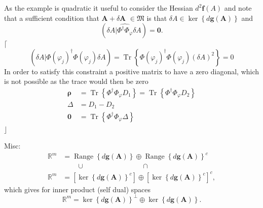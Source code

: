 \documentclass[aps,preprint]{revtex4}%
\begin{document}
As the example is quadratic it useful to consider the Hessian $d^{2}%
\boldsymbol{f}\left(  A\right)  $ and note that a sufficient condition that
$\boldsymbol{A}+\delta\boldsymbol{A}$ $\in\mathfrak{M}$ is that $\delta
A\in\ker\left\{  d\boldsymbol{g}\left(  \boldsymbol{A}\right)  \right\}  $
and
\begin{equation}
\left(  \left.  \delta A\right\vert \widehat{\Phi^{\dagger}\Phi_{\varphi}%
}\delta A\right)  =\mathbf{0}.
\end{equation}
$\lceil$%
\begin{equation}
\left(  \left.  \delta A\right\vert \Phi\left(  \varphi_{j}\right)  ^{\dagger
}\Phi\left(  \varphi_{j}\right)  \delta A\right)  =\operatorname{Tr}\left\{
\Phi\left(  \varphi_{j}\right)  ^{\dagger}\Phi\left(  \varphi_{j}\right)
\left(  \delta A\right)  ^{2}\right\}  =0
\end{equation}
In order to satisfy this constraint a positive matrix to have a zero diagonal,
which is not possible as the trace would then be zero%
\begin{align}
\mathbf{\rho}  &  =\operatorname{Tr}\left\{  \Phi^{\dagger}\Phi_{\varphi}%
D_{1}\right\}  =\operatorname{Tr}\left\{  \Phi^{\dagger}\Phi_{\varphi}%
D_{2}\right\} \\
\Delta &  =D_{1}-D_{2}\\
\mathbf{0}  &  =\operatorname{Tr}\left\{  \Phi^{\dagger}\Phi_{\varphi}%
\Delta\right\}
\end{align}
$\rfloor$

Misc:
\begin{align*}
\mathbb{R}^{m}  &  =\operatorname*{Range}\left\{  d\boldsymbol{g}\left(
\boldsymbol{A}\right)  \right\}  \oplus\operatorname*{Range}\left\{
d\boldsymbol{g}\left(  \boldsymbol{A}\right)  \right\}  ^{c}\\
&  \qquad\cup\qquad\qquad\qquad\qquad\cap\\
\mathbb{R}^{m}  &  =\left[  \ker\left\{  d\boldsymbol{g}\left(  \boldsymbol{A}%
\right)  \right\}  ^{c}\right]  \oplus\left[  \ker\left\{  d\boldsymbol{g}%
\left(  \boldsymbol{A}\right)  \right\}  ^{c}\right]  ^{c},
\end{align*}
which gives for inner product (self dual) spaces
\[
\mathbb{R}^{m}=\ker\left\{  d\boldsymbol{g}\left(  \boldsymbol{A}\right)
\right\}  ^{\bot}\oplus\ker\left\{  d\boldsymbol{g}\left(  \boldsymbol{A}%
\right)  \right\}  .
\]
\end{document}
